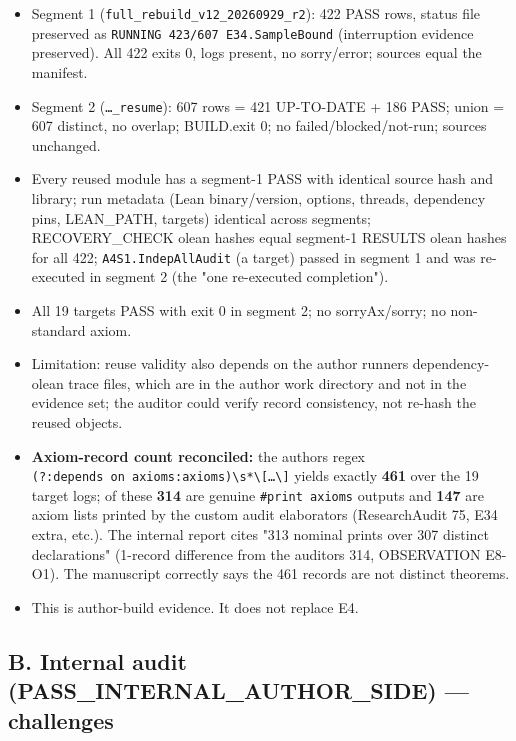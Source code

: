 \documentclass[
]{article}
\providecommand{\tightlist}{%
  \setlength{\itemsep}{0pt}\setlength{\parskip}{0pt}}
\begin{document}
\begin{itemize}
\tightlist
\item
  Segment 1 (\texttt{full\_rebuild\_v12\_20260929\_r2}): 422 PASS rows,
  status file preserved as \texttt{RUNNING\ 423/607\ E34.SampleBound}
  (interruption evidence preserved). All 422 exits 0, logs present, no
  sorry/error; sources equal the manifest.
\item
  Segment 2 (\texttt{…\_resume}): 607 rows = 421 UP-TO-DATE + 186 PASS;
  union = 607 distinct, no overlap; BUILD.exit 0; no
  failed/blocked/not-run; sources unchanged.
\item
  Every reused module has a segment-1 PASS with identical source hash
  and library; run metadata (Lean binary/version, options, threads,
  dependency pins, LEAN\_PATH, targets) identical across segments;
  RECOVERY\_CHECK olean hashes equal segment-1 RESULTS olean hashes for
  all 422; \texttt{A4S1.IndepAllAudit} (a target) passed in segment 1
  and was re-executed in segment 2 (the "one re-executed completion").
\item
  All 19 targets PASS with exit 0 in segment 2; no sorryAx/sorry; no
  non-standard axiom.
\item
  Limitation: reuse validity also depends on the author
  runner\textquotesingle s dependency-olean trace files, which are in
  the author work directory and not in the evidence set; the auditor
  could verify record consistency, not re-hash the reused objects.
\item
  \textbf{Axiom-record count reconciled:} the author\textquotesingle s
  regex
  \texttt{(?:depends\ on\ axioms:\textbar{}axioms)\textbackslash{}s*\textbackslash{}{[}…\textbackslash{}{]}}
  yields exactly \textbf{461} over the 19 target logs; of these
  \textbf{314} are genuine \texttt{\#print\ axioms} outputs and
  \textbf{147} are axiom lists printed by the custom audit elaborators
  (ResearchAudit 75, E34 extra, etc.). The internal report cites "313
  nominal prints over 307 distinct declarations" (1-record difference
  from the auditor\textquotesingle s 314, OBSERVATION E8-O1). The
  manuscript correctly says the 461 records are not distinct theorems.
\item
  This is author-build evidence. It does not replace E4.
\end{itemize}

\subsection{B. Internal audit (PASS\_INTERNAL\_AUTHOR\_SIDE) ---
challenges}\label{b-internal-audit-pass_internal_author_side--challenges}
\end{document}
